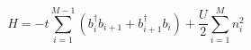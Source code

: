 \documentclass{article}
\begin{document}
\[H = -t\sum\limits_{i=1}^{M-1}( b_{i}^\dagger  b_{i+1} +  b_{i+1}^\dagger  b_{i}) + \frac{U}{2}\sum\limits_{i=1}^{M} n_i^2\]
\end{document}
